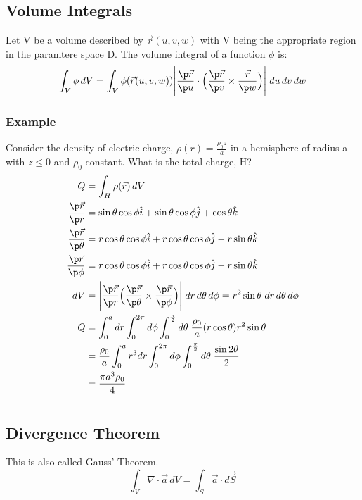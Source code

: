 \documentclass[a4paper, 11pt, normalem]{report}
\begin{document}
\section{Volume Integrals}
Let V be a volume described by $\vec{r}(u, v, w)$ with V being the appropriate region in the paramtere space D.
The volume integral of a function $\phi$ is:
\begin{equation*}
    \int_V \phi\,dV = \int_V \phi(\vec{r}(u, v, w)) \Bigg| \frac{\p \vec{r}}{\p u} \cdot \Big(\frac{\p \vec{r}}{\p v} \times \frac{\vec{r}}{\p w}\Big)\Bigg|\;du\,dv\,dw
\end{equation*}

\subsection{Example}
Consider the density of electric charge, $\rho(r) = \frac{\rho_0 z}{a}$ in a hemisphere of radius a with $z \leq 0$ and $\rho_0$ constant.
What is the total charge, H?
\begin{align*}
    Q &= \int_H \rho(\vec{r})\,dV \\
    \frac{\p \vec{r}}{\p r} &= \sin\theta\cos\phi \hat{i} + \sin\theta\cos\phi \hat{j} + \cos\theta \hat{k} \\
    \frac{\p \vec{r}}{\p \theta} &= r\cos\theta\cos\phi \hat{i} + r\cos\theta\cos\phi \hat{j} - r\sin\theta \hat{k} \\
    \frac{\p \vec{r}}{\p \phi} &= r\cos\theta\cos\phi \hat{i} + r\cos\theta\cos\phi \hat{j} - r\sin\theta\hat{k} \\
    dV &= \Bigg| \frac{\p \vec{r}}{\p r} \Big(\frac{\p \vec{r}}{\p \theta} \times \frac{\p \vec{r}}{\p \phi}\Big)\Bigg|\;dr\,d\theta\,d\phi = r^2 \sin\theta \;dr\,d\theta\,d\phi \\
    Q &= \int_{0}^a dr \int_0^{2\pi} d\phi \int_{0}^{\frac{\pi}{2}} d\theta\; \frac{\rho_0}{a} (r\cos\theta)r^2\sin\theta \\
    &= \frac{\rho_0}{a} \int_0^a r^3 dr \int_0^{2\pi} d\phi \int_{0}^{\frac{\pi}{2}} d\theta\; \frac{\sin 2\theta}{2} \\
    &= \frac{\pi a^3 \rho_0}{4}
\end{align*}


\chapter{}
\section{Divergence Theorem}
This is also called Gauss' Theorem.
\begin{equation*}
    \int_V \nabla \cdot \vec{a}\,dV = \int_S \vec{a}\cdot d\vec{S}
\end{equation*}
\end{document}
